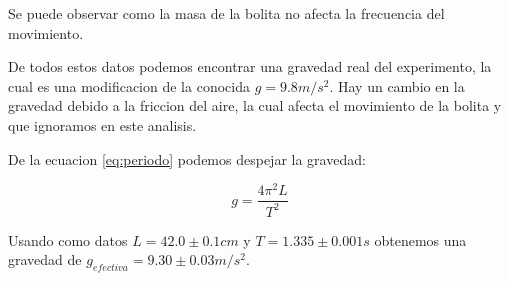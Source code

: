 \documentclass[12pt,a4]{article}
\begin{document}
Se puede observar como la masa de la bolita no afecta la frecuencia del movimiento.

De todos estos datos podemos encontrar una gravedad real del experimento, la cual es una modificacion de la conocida $g = 9.8 m/s^2$. Hay un cambio en la gravedad debido a la friccion del aire, la cual afecta el movimiento de la bolita y que ignoramos en este analisis.

De la ecuacion \ref{eq:periodo} podemos despejar la gravedad:

\begin{equation}
    g = \frac{4 \pi^2 L}{T^2}
    \label{eq:gravedad}
\end{equation}

Usando como datos $L = 42.0 \pm 0.1 cm$ y $T = 1.335 \pm 0.001 s$ obtenemos una gravedad de $g_{efectiva} = 9.30 \pm 0.03 m/s^2$.
\end{document}
